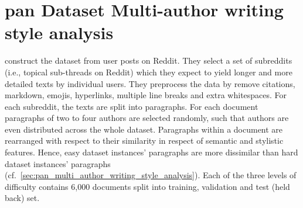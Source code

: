 \section{\acs{pan} Dataset Multi-author writing style analysis}
\label{sec:pan_dataset_multi_author_writing_style_analysis}

\citet{zangerle_overview_2024} construct the dataset from user posts on Reddit.
They select a set of subreddits (i.e., topical sub-threads on Reddit) 
which they expect to yield longer and more detailed texts by individual users.
They preprocess the data by remove citations, markdown, emojis, hyperlinks, 
multiple line breaks and extra whitespaces.
For each subreddit, the texts are split into paragraphs.
For each document paragraphs of two to four authors are selected randomly, 
such that authors are even distributed across the whole dataset.
Paragraphs within a document are rearranged with respect to their similarity 
in respect of semantic and stylistic features.
Hence, easy dataset instances' paragraphs are more dissimilar 
than hard dataset instances' paragraphs (cf.~\autoref{sec:pan_multi_author_writing_style_analysis}).
Each of the three levels of difficulty contains 6,000 documents 
split into training, validation and test (held back) set.